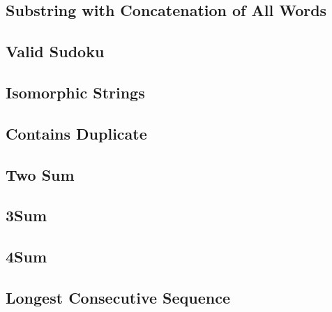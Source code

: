     
\subsection{Substring with Concatenation of All Words}

\subsection{Valid Sudoku}

\subsection{Isomorphic Strings}

\subsection{Contains Duplicate}

\subsection{Two Sum}

\subsection{3Sum}

\subsection{4Sum}

\subsection{Longest Consecutive Sequence}


